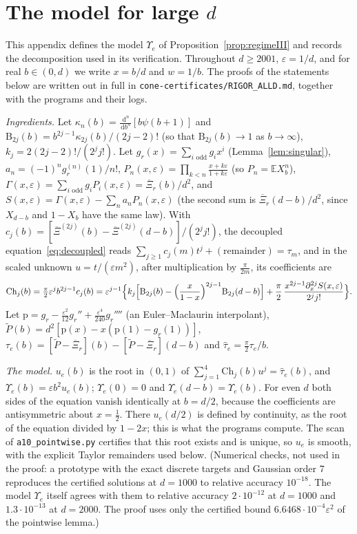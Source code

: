\documentclass[11pt]{amsart}
\theoremstyle{definition}
\theoremstyle{remark}
\numberwithin{equation}{section}
\newcommand{\E}{\mathbb{E}}
\newcommand{\Xb}{\overline{\Xi}}
\newcommand{\dd}{\,\mathrm{d}}
\begin{document}
\appendix
\section{The model for large \texorpdfstring{$d$}{d}}\label{app:model}

This appendix defines the model $\Upsilon_e$ of Proposition~\ref{prop:regimeIII} and records the decomposition used in its
verification. Throughout $d\ge2001$, $\varepsilon=1/d$, and for real $b\in(0,d)$ we write $x=b/d$ and $w=1/b$. The proofs
of the statements below are written out in full in \texttt{cone-certificates/RIGOR\_ALLD.md}, together with the programs
and their logs.

\emph{Ingredients.} Let $\kappa_n(b)=\frac{\dd^n}{\dd b^n}[b\psi(b+1)]$ and $\mathrm B_{2j}(b)=b^{2j-1}\kappa_{2j}(b)/(2j-2)!$ (so that
$\mathrm B_{2j}(b)\to1$ as $b\to\infty$), $k_j=2(2j-2)!/(2^jj!)$. Let $g_r(x)=\sum_{i\text{ odd}}g_ix^i$ (Lemma~\ref{lem:singular}),
$a_n=(-1)^ng_r^{(n)}(1)/n!$, $P_n(x,\varepsilon)=\prod_{k<n}\frac{x+k\varepsilon}{1+k\varepsilon}$ (so $P_n=\E X_b^n$),
$\Gamma(x,\varepsilon)=\sum_{i\text{ odd}}g_iP_i(x,\varepsilon)=\Xb_r(b)/d^2$, and $S(x,\varepsilon)=\Gamma(x,\varepsilon)-\sum_na_nP_n(x,\varepsilon)$
(the second sum is $\Xb_r(d-b)/d^2$, since $X_{d-b}$ and $1-X_b$ have the same law). With
$c_j(b)=[\Xb^{(2j)}(b)-\Xb^{(2j)}(d-b)]/(2^jj!)$, the decoupled equation~\eqref{eq:decoupled} reads
$\sum_{j\ge1}c_j(m)t^j+(\text{remainder})=\tau_m$, and in the scaled unknown $u=t/(\varepsilon m^2)$, after multiplication by
$\frac\pi{2m}$, its coefficients are
\[
\mathrm{Ch}_j(b)=\tfrac\pi2\varepsilon^jb^{2j-1}c_j(b)=\varepsilon^{j-1}\Bigl\{k_j\Bigl[\mathrm B_{2j}(b)-\Bigl(\frac x{1-x}\Bigr)^{2j-1}\mathrm B_{2j}(d-b)\Bigr]
+\frac\pi2\,\frac{x^{2j-1}\partial_x^{2j}S(x,\varepsilon)}{2^jj!}\Bigr\}.
\]
Let $\mathrm p=g_r-\frac{\varepsilon^2}{12}g_r''+\frac{\varepsilon^4}{240}g_r''''$ (an Euler--Maclaurin interpolant), $\tilde P(b)=d^2[\mathrm p(x)-x(\mathrm p(1)-g_r(1))]$,
$\tau_e(b)=[\tilde P-\Xb_r](b)-[\tilde P-\Xb_r](d-b)$ and $\hat\tau_e=\frac\pi2\tau_e/b$.

\emph{The model.} $u_e(b)$ is the root in $(0,1)$ of $\sum_{j=1}^4\mathrm{Ch}_j(b)u^j=\hat\tau_e(b)$, and $\Upsilon_e(b)=\varepsilon b^2u_e(b)$;
$\Upsilon_e(0)=0$ and $\Upsilon_e(d-b)=\Upsilon_e(b)$. For even $d$ both sides of the equation vanish identically at
$b=d/2$, because the coefficients are antisymmetric about $x=\frac12$. There $u_e(d/2)$ is defined by continuity, as the
root of the equation divided by $1-2x$; this is what the programs compute. The scan of \texttt{a10\_pointwise.py} certifies
that this root exists and is unique, so $u_e$ is smooth, with the explicit Taylor remainders used below. (Numerical
checks, not used in the proof: a prototype with the exact discrete targets and Gaussian order $7$ reproduces the
certified solutions at $d=1000$ to relative accuracy $10^{-18}$. The model $\Upsilon_e$ itself agrees with them to relative
accuracy $2\cdot10^{-12}$ at $d=1000$ and $1.3\cdot10^{-13}$ at $d=2000$. The proof uses only the certified bound
$6.6468\cdot10^{-4}\varepsilon^2$ of the pointwise lemma.)
\end{document}
